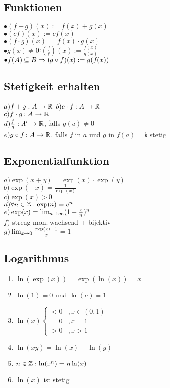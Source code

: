 \subsection*{Funktionen}
$\bullet (f + g)(x) := f(x) + g(x)$\\
$\bullet (cf)(x) := c f(x)$\\
$\bullet (f \cdot g)(x) := f(x) \cdot g(x)$\\
$\bullet g(x) \neq 0$:$\left(\frac{f}{g}\right)(x) := \frac{f(x)}{g(x)}$\\
$\bullet f(A) \subseteq B \Rightarrow (g \circ f)(x) := g(f(x))$
\subsection*{Stetigkeit erhalten}
$a) f + g: A \rightarrow \mathbb R$
$b) c \cdot f: A \rightarrow \mathbb R$\\
$c) f \cdot g: A \rightarrow \mathbb R$\\
$d) \frac{f}{g}: A' \rightarrow \mathbb R$, falls $g(a) \neq 0$\\
$e) g \circ f: A \rightarrow \mathbb R$, falls $f$ in $a$ und $g$ in $f(a) = b$ stetig
\subsection*{Exponentialfunktion}
$a) \exp(x + y) = \exp(x) \cdot \exp(y)$\\
$b) \exp(-x) = \frac{1}{\exp(x)}$\\
$c) \exp(x) > 0$\\
$d) \forall n \in \mathbb Z: \exp(n) = e^n$\\
$e) \exp(x) = \lim_{n \rightarrow \infty} (1 + \frac{x}{n})^n$\\
$f)$ streng mon. wachsend + bijektiv\\
$g) \lim_{x \rightarrow 0} \frac{\exp(x) - 1}{x} = 1$
\subsection*{Logarithmus}
\begin{enumerate}[label=\alph*., noitemsep]
    \item $\ln(\exp(x)) = \exp(\ln(x)) = x$
    \item $\ln(1) = 0$ und $\ln(e) = 1$
    \item $\ln(x) \begin{cases}
    < 0 &, x \in (0, 1)\\
    = 0 &, x = 1\\
    > 0 &, x > 1
    \end{cases}$
    \item $\ln(xy) = \ln(x) + \ln(y)$
    \item $n \in \mathbb Z: \ln(x^n) = n \ln(x)$
    \item $\ln(x)$ ist stetig
\end{enumerate}
